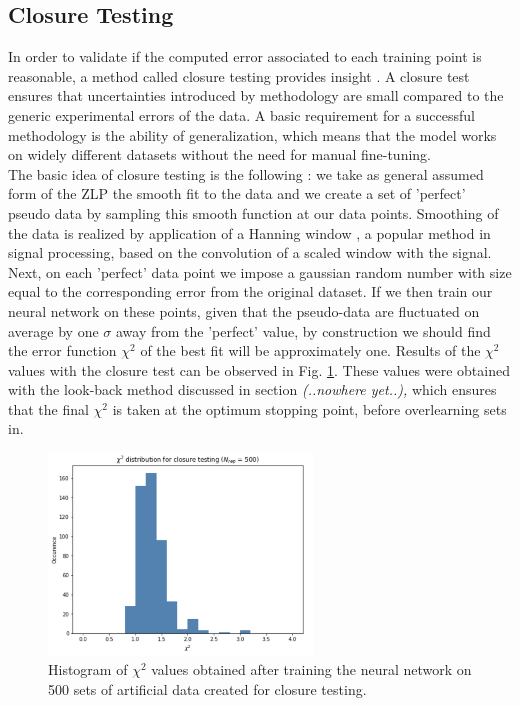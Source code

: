 \documentclass[11pt,a4paper]{article}
\numberwithin{equation}{section}
\numberwithin{figure}{section}
\numberwithin{table}{section}
\begin{document}
\subsection{Closure Testing}
In order to validate if the computed error associated to each training point is reasonable, a method called closure testing provides insight \cite{closure}. A closure test ensures that uncertainties introduced by methodology are small compared to the generic experimental errors of the data. A basic requirement for a successful methodology is the ability of generalization, which means that the model works on widely different datasets without the need for manual fine-tuning.\\
The basic idea of closure testing is the following \cite{closure}: we take as general assumed form of the ZLP the smooth fit to the data and we create a set of 'perfect' pseudo data by sampling this smooth function at our data points. Smoothing of the data is realized by application of a Hanning window \cite{hann}, a popular method in signal processing, based on the convolution of a scaled window with the signal. \\
Next, on each 'perfect' data point we impose a gaussian random number with size equal to the corresponding error from the original dataset. If we then train our neural network on these points, given that the pseudo-data are fluctuated on average by one $\sigma$ away from the 'perfect' value, by construction we should find the error function $\chi^2$ of the best fit will be approximately one. Results of the $\chi^2$ values with the closure test can be observed in Fig. \ref{closure}. These values were obtained with the look-back method discussed in section \textit{ (..nowhere yet..),} which ensures that the final $\chi^2$ is taken at the optimum stopping point, before overlearning sets in.

\begin{figure}[H]
    \centering
    \includegraphics[width=70mm]{plots/closure.png}
    \caption{Histogram of $\chi^2$ values obtained after training the neural network on 500 sets of artificial data created for closure testing.}
    \label{closure}
\end{figure}
\end{document}
